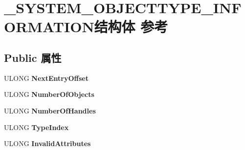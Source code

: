 \hypertarget{struct___s_y_s_t_e_m___o_b_j_e_c_t_t_y_p_e___i_n_f_o_r_m_a_t_i_o_n}{}\section{\+\_\+\+S\+Y\+S\+T\+E\+M\+\_\+\+O\+B\+J\+E\+C\+T\+T\+Y\+P\+E\+\_\+\+I\+N\+F\+O\+R\+M\+A\+T\+I\+O\+N结构体 参考}
\label{struct___s_y_s_t_e_m___o_b_j_e_c_t_t_y_p_e___i_n_f_o_r_m_a_t_i_o_n}
\subsection*{Public 属性}
\begin{DoxyCompactItemize}
\item 
\mbox{\label{struct___s_y_s_t_e_m___o_b_j_e_c_t_t_y_p_e___i_n_f_o_r_m_a_t_i_o_n_a9852ebe4841682d5751dedfea6a73f5d}} 
U\+L\+O\+NG {\bfseries Next\+Entry\+Offset}
\item 
\mbox{\label{struct___s_y_s_t_e_m___o_b_j_e_c_t_t_y_p_e___i_n_f_o_r_m_a_t_i_o_n_aedba383f2df97043de8cac26b15e6d41}} 
U\+L\+O\+NG {\bfseries Number\+Of\+Objects}
\item 
\mbox{\label{struct___s_y_s_t_e_m___o_b_j_e_c_t_t_y_p_e___i_n_f_o_r_m_a_t_i_o_n_ae18512f7a51652eecdf4282bee53664a}} 
U\+L\+O\+NG {\bfseries Number\+Of\+Handles}
\item 
\mbox{\label{struct___s_y_s_t_e_m___o_b_j_e_c_t_t_y_p_e___i_n_f_o_r_m_a_t_i_o_n_a3e383f327d449d701af2c5d85bed2eb2}} 
U\+L\+O\+NG {\bfseries Type\+Index}
\item 
\mbox{\label{struct___s_y_s_t_e_m___o_b_j_e_c_t_t_y_p_e___i_n_f_o_r_m_a_t_i_o_n_a0936bd8fe2ea8c8edc0d79cb92c0a69e}} 
U\+L\+O\+NG {\bfseries Invalid\+Attributes}
\item 
\mbox{\label{struct___s_y_s_t_e_m___o_b_j_e_c_t_t_y_p_e___i_n_f_o_r_m_a_t_i_o_n_a43fed272e073c4ed154aabe8b3383f70}} 

\end{DoxyCompactItemize}
